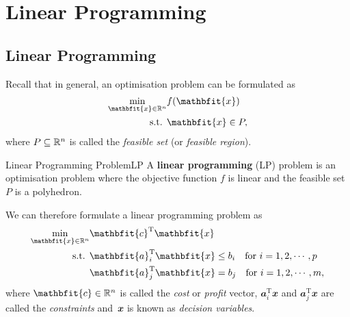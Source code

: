 \documentclass[math, code]{amznotes}
\theoremstyle{remark}
\begin{document}
\tableofcontents

\chapter{Linear Programming}
\section{Linear Programming}
Recall that in general, an optimisation problem can be formulated as
\begin{align*}
    \min_{\mathbfit{x} \in \R^n} & f(\mathbfit{x}) \\
    \textrm{s.t. } & \mathbfit{x} \in P,
\end{align*}
where $P \subseteq \mathbb{R}^n$ is called the \textit{feasible set} (or \textit{feasible region}).
\begin{dfnbox}{Linear Programming Problem}{LP}
    A {\color{red} \textbf{linear programming}} (LP) problem is an optimisation problem where the objective function $f$ is linear and the feasible set $P$ is a polyhedron.
\end{dfnbox}
We can therefore formulate a linear programming problem as
\begin{align*}
    \min_{\mathbfit{x} \in \R^n} & \mathbfit{c}^{\mathrm{T}}\mathbfit{x} \\
    \textrm{s.t. } & \mathbfit{a}_i^{\mathrm{T}}\mathbfit{x} \leq b_i \quad \textrm{for } i = 1, 2, \cdots, p \\
    & \mathbfit{a}_j^{\mathrm{T}}\mathbfit{x} = b_j \quad \textrm{for } i = 1, 2, \cdots, m,
\end{align*}
where $\mathbfit{c} \in \R^n$ is called the \textit{cost} or \textit{profit} vector, $\mathbfit{a}_i^{\mathrm{T}}\mathbfit{x}$ and $\mathbfit{a}_j^{\mathrm{T}}\mathbfit{x}$ are called the \textit{constraints} and~$\mathbfit{x}$ is known as \textit{decision variables}.
\end{document}
